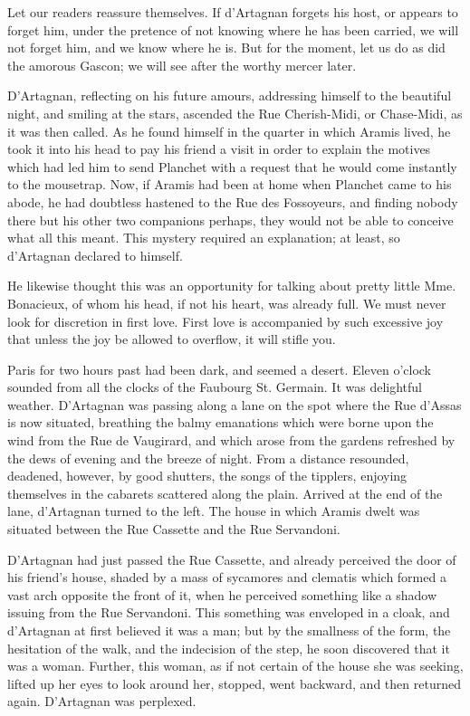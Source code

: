 Let our readers reassure themselves. If d'Artagnan forgets his host, or appears to forget him, under the pretence of not knowing where he has been carried, we will not forget him, and we know where he is. But for the moment, let us do as did the amorous Gascon; we will see after the worthy mercer later. 

D'Artagnan, reflecting on his future amours, addressing himself to the beautiful night, and smiling at the stars, ascended the Rue Cherish-Midi, or Chase-Midi, as it was then called. As he found himself in the quarter in which Aramis lived, he took it into his head to pay his friend a visit in order to explain the motives which had led him to send Planchet with a request that he would come instantly to the mousetrap. Now, if Aramis had been at home when Planchet came to his abode, he had doubtless hastened to the Rue des Fossoyeurs, and finding nobody there but his other two companions perhaps, they would not be able to conceive what all this meant. This mystery required an explanation; at least, so d'Artagnan declared to himself. 

He likewise thought this was an opportunity for talking about pretty little Mme. Bonacieux, of whom his head, if not his heart, was already full. We must never look for discretion in first love. First love is accompanied by such excessive joy that unless the joy be allowed to overflow, it will stifle you. 

Paris for two hours past had been dark, and seemed a desert. Eleven o'clock sounded from all the clocks of the Faubourg St. Germain. It was delightful weather. D'Artagnan was passing along a lane on the spot where the Rue d'Assas is now situated, breathing the balmy emanations which were borne upon the wind from the Rue de Vaugirard, and which arose from the gardens refreshed by the dews of evening and the breeze of night. From a distance resounded, deadened, however, by good shutters, the songs of the tipplers, enjoying themselves in the cabarets scattered along the plain. Arrived at the end of the lane, d'Artagnan turned to the left. The house in which Aramis dwelt was situated between the Rue Cassette and the Rue Servandoni. 

D'Artagnan had just passed the Rue Cassette, and already perceived the door of his friend's house, shaded by a mass of sycamores and clematis which formed a vast arch opposite the front of it, when he perceived something like a shadow issuing from the Rue Servandoni. This something was enveloped in a cloak, and d'Artagnan at first believed it was a man; but by the smallness of the form, the hesitation of the walk, and the indecision of the step, he soon discovered that it was a woman. Further, this woman, as if not certain of the house she was seeking, lifted up her eyes to look around her, stopped, went backward, and then returned again. D'Artagnan was perplexed. 

